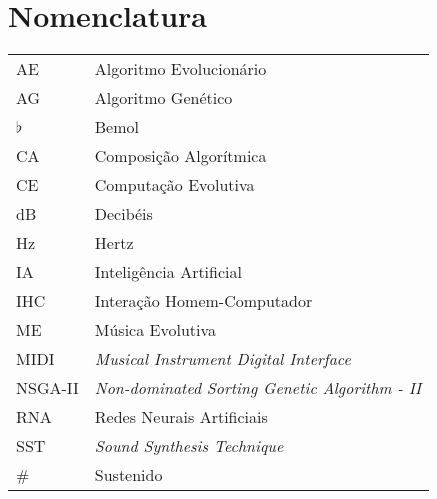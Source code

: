 \chapter*{Nomenclatura}


\begin{tabular*}{20cm}{lp{12cm}}
AE & Algoritmo Evolucionário \\
AG & Algoritmo Genético \\
$\flat$ & Bemol \\
CA & Composição Algorítmica\\
CE & Computação Evolutiva\\
dB & Decibéis \\
Hz & Hertz \\
IA & Inteligência Artificial \\
IHC & Interação Homem-Computador \\
ME & Música Evolutiva \\
MIDI & \textit{Musical Instrument Digital Interface} \\
NSGA-II & \textit{Non-dominated Sorting Genetic Algorithm - II} \\
RNA & Redes Neurais Artificiais \\
SST &  \textit{Sound Synthesis Technique} \\
\# & Sustenido\\
\end{tabular*}

